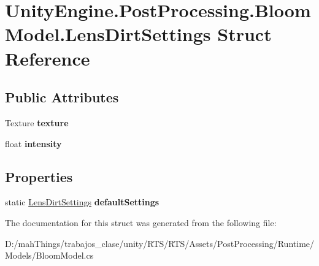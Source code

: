\hypertarget{struct_unity_engine_1_1_post_processing_1_1_bloom_model_1_1_lens_dirt_settings}{}\section{Unity\+Engine.\+Post\+Processing.\+Bloom\+Model.\+Lens\+Dirt\+Settings Struct Reference}
\label{struct_unity_engine_1_1_post_processing_1_1_bloom_model_1_1_lens_dirt_settings}
\subsection*{Public Attributes}
\begin{DoxyCompactItemize}
\item 
\mbox{\label{struct_unity_engine_1_1_post_processing_1_1_bloom_model_1_1_lens_dirt_settings_a49f3c63b8474a37689597b9dda3bc026}} 
Texture {\bfseries texture}
\item 
\mbox{\label{struct_unity_engine_1_1_post_processing_1_1_bloom_model_1_1_lens_dirt_settings_abad6ccaf7daa6d25b6561005934f80c2}} 
float {\bfseries intensity}
\end{DoxyCompactItemize}
\subsection*{Properties}
\begin{DoxyCompactItemize}
\item 
\mbox{\label{struct_unity_engine_1_1_post_processing_1_1_bloom_model_1_1_lens_dirt_settings_ad206ec5b45a4c02bb502139d76e56a9c}} 
static \mbox{\hyperlink{struct_unity_engine_1_1_post_processing_1_1_bloom_model_1_1_lens_dirt_settings}{Lens\+Dirt\+Settings}} {\bfseries default\+Settings}
\end{DoxyCompactItemize}


The documentation for this struct was generated from the following file\+:\begin{DoxyCompactItemize}
\item 
D\+:/mah\+Things/trabajos\+\_\+clase/unity/\+R\+T\+S/\+R\+T\+S/\+Assets/\+Post\+Processing/\+Runtime/\+Models/Bloom\+Model.\+cs\end{DoxyCompactItemize}
